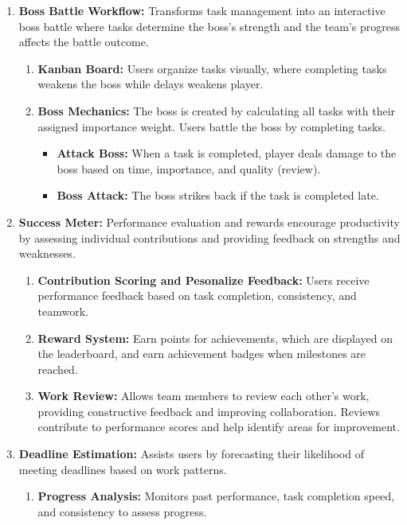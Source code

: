 \begin{enumerate}[leftmargin=80pt]  
    \item \textbf{Boss Battle Workflow:} Transforms task management into an interactive boss battle where tasks determine the boss’s strength and the team's progress affects the battle outcome.  
    \begin{enumerate}  
        \item \textbf{Kanban Board:} Users organize tasks visually, where completing tasks weakens the boss while delays weakens player.  
        \item \textbf{Boss Mechanics:} The boss is created by calculating all tasks with their assigned importance weight. Users battle the boss by completing tasks.
        \begin{itemize}
            \item \textbf{Attack Boss:} When a task is completed, player deals damage to the boss based on time, importance, and quality (review).
            \item \textbf{Boss Attack:} The boss strikes back if the task is completed late.
        \end{itemize}
    \end{enumerate}  

    \item \textbf{Success Meter:} Performance evaluation and rewards encourage productivity by assessing individual contributions and providing feedback on strengths and weaknesses.  
    \begin{enumerate}  
        \item \textbf{Contribution Scoring and Pesonalize Feedback:} Users receive performance feedback based on task completion, consistency, and teamwork.  
        \item \textbf{Reward System:} Earn points for achievements, which are displayed on the leaderboard, and earn achievement badges when milestones are reached.  
        \item \textbf{Work Review:} Allows team members to review each other’s work, providing constructive feedback and improving collaboration. Reviews contribute to performance scores and help identify areas for improvement.  
    \end{enumerate}  

    \item \textbf{Deadline Estimation:} Assists users by forecasting their likelihood of meeting deadlines based on work patterns.  
    \begin{enumerate}  
        \item \textbf{Progress Analysis:} Monitors past performance, task completion speed, and consistency to assess progress.  
    \end{enumerate}  
\end{enumerate}  


